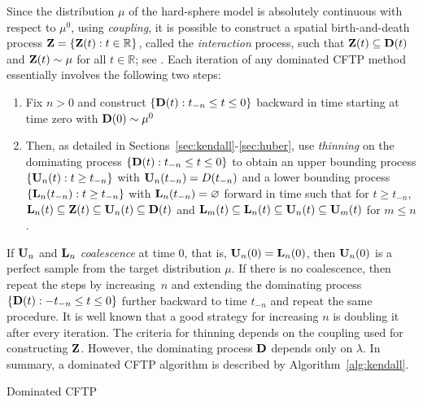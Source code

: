 \documentclass[11pt]{article}
\newcommand{\reals}{\mathbb{R}}
\begin{document}
Since the distribution $\mu$ of the hard-sphere model is absolutely continuous with respect to $\mu^0$, using {\it coupling}, it is possible to construct a spatial birth-and-death process ${\mZ = \{\mZ(t) : t \in \reals\}}$, called the {\it interaction} process, such that ${\mathbf{Z}(t) \subseteq \mathbf{D}(t)}$ and ${\mathbf{Z}(t) \sim \mu}$ for all ${t \in \reals}$; see \cite{KM00}. Each iteration of any dominated CFTP method essentially involves the following two steps: 
\begin{enumerate}
\item Fix $n > 0$ and  construct ${\{\mathbf{D}(t): t_{-n} \leq t \leq 0\}}$ backward in time starting at time zero with ${\mathbf{D}(0) \sim \mu^0}$
\item Then, as detailed in Sections~\ref{sec:kendall}-\ref{sec:huber}, use {\em thinning} on the dominating process $\{\mathbf{D}(t): t_{-n} \leq t \leq 0\}$ to obtain an upper bounding process ${\{\mathbf{U}_n(t) : t \geq t_{-n}  \}}$ with ${\mathbf{U}_n(t_{-n}) = D(t_{-n})}$ and a lower bounding process ${\{\mathbf{L}_n(t_{-n}) : t \geq t_{-n} \}}$ with ${\mathbf{L}_n(t_{-n}) = \varnothing}$ forward in time such that for ${t \geq t_{-n}}$, ${\mathbf{L}_n(t)\subseteq \mathbf{Z}(t) \subseteq \mathbf{U}_n(t) \subseteq \mathbf{D}(t)}$ and ${\mathbf{L}_m(t)\subseteq \mathbf{L}_n(t) \subseteq \mathbf{U}_n(t) \subseteq \mathbf{U}_m(t)}$ for $m \leq n$.
\end{enumerate}
 If $\mathbf{U}_n$ and $\mathbf{L}_n$ {\em coalescence} at time $0$, that is, ${\mathbf{U}_n(0) = \mathbf{L}_n(0)}$, then  $\mathbf{U}_n(0)$ is a perfect sample from the target distribution $\mu$. If there is no coalescence, then repeat the steps by increasing~$n$ and extending the dominating process ${\{\mathbf{D}(t): -t_{-n} \leq t \leq 0\}}$ further backward to time $t_{-n}$ and repeat the same procedure. It is well known that a good strategy for increasing $n$ is doubling it after every iteration.  The criteria for thinning depends on the coupling used for constructing $\mathbf{Z}$. However, the dominating process $\mathbf{D}$ depends only on $\lambda$. In summary, a dominated CFTP algorithm is described by Algorithm~\ref{alg:kendall}.
\begin{algorithm}
  \caption{Dominated CFTP}
  \label{alg:kendall}
  \begin{algorithmic}[1]
    \Repeat
    \\
  \end{algorithmic}
\end{algorithm}
\end{document}
